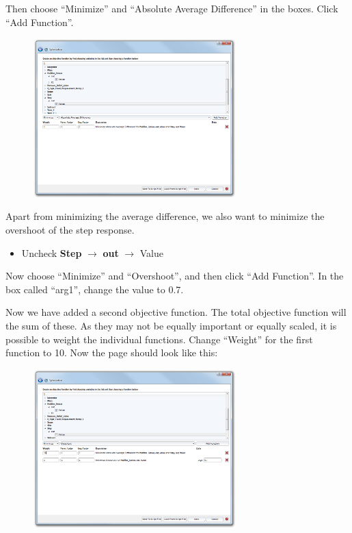 \documentclass[a4paper,pdftex]{article}
\begin{document}
\begin{tutenumerate}
Then choose \enquote{Minimize} and \enquote{Absolute Average Difference} in the boxes. Click \enquote{Add Function}.

\FloatBarrier
\begin{figure}[htb]
\center
\includegraphics[width=0.7\textwidth]{gfx/optimization/screenshot-opt3a.png}
\end{figure}
\FloatBarrier

Apart from minimizing the average difference, we also want to minimize the overshoot of the step response. 
\begin{itemize}
\item Uncheck \textbf{Step} $\rightarrow$ \textbf{out} $\rightarrow$ Value
\end{itemize}

Now choose \enquote{Minimize} and \enquote{Overshoot}, and then click \enquote{Add Function}. In the box called \enquote{arg1}, change the value to 0.7. 

\newpage
Now we have added a second objective function. The total objective function will the sum of these. As they may not be equally important or equally scaled, it is possible to weight the individual functions.  Change \enquote{Weight} for the first function to 10. Now the page should look like this:

\FloatBarrier
\begin{figure}[htb]
\center
\includegraphics[width=0.7\textwidth]{gfx/optimization/screenshot-opt3b.png}
\end{figure}
\FloatBarrier


\end{tutenumerate}
\end{document}
